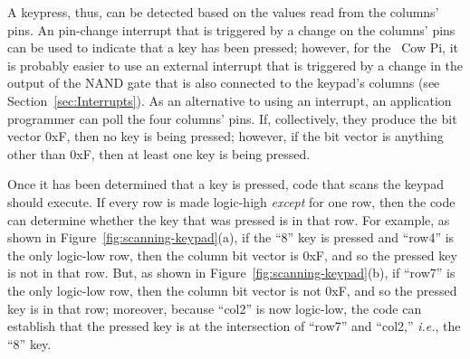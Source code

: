 A keypress, thus, can be detected based on the values read from the columns' pins.
An pin-change interrupt that is triggered by a change on the columns' pins can be used to indicate that a key has been pressed;
however, for the \hardwareversion~Cow Pi, it is probably easier to use an external interrupt that is triggered by a change in the output of the NAND gate that is also connected to the keypad's columns (see Section~\ref{sec:Interrupts}).
As an alternative to using an interrupt, an application programmer can poll the four columns' pins.
If, collectively, they produce the bit vector 0xF, then no key is being pressed;
however, if the bit vector is anything other than 0xF, then at least one key is being pressed.

Once it has been determined that a key is pressed, code that scans the keypad should execute.
If every row is made logic-high \textit{except} for one row, then the code can determine whether the key that was pressed is in that row.
For example, as shown in Figure~\ref{fig:scanning-keypad}(a), if the ``8'' key is pressed and ``row4'' is the only logic-low row, then the column bit vector is 0xF, and so the pressed key is not in that row.
But, as shown in Figure~\ref{fig:scanning-keypad}(b), if ``row7'' is the only logic-low row, then the column bit vector is not 0xF, and so the pressed key is in that row;
moreover, because ``col2'' is now logic-low, the code can establish that the pressed key is at the intersection of ``row7'' and ``col2,'' \textit{i.e.}, the ``8'' key.

